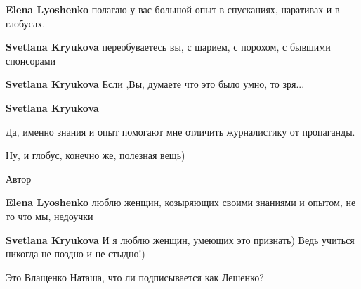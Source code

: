 \begin{itemize}
\begin{itemize}
\textbf{Elena Lyoshenko} полагаю у вас большой опыт в спусканиях, наративах и в глобусах.

 
\textbf{Svetlana Kryukova} переобуваетесь вы, с шарием, с порохом, с бывшими спонсорами

 
\textbf{Svetlana Kryukova} Если ,Вы, думаете что это было умно, то зря...

 
\textbf{Svetlana Kryukova}

Да, именно знания и опыт помогают мне отличить журналистику от пропаганды.

Ну, и глобус, конечно же, полезная вещь)


Автор
 
\textbf{Elena Lyoshenko} люблю женщин, козыряющих своими знаниями и опытом, не то что мы, недоучки

 
\textbf{Svetlana Kryukova}
И я люблю женщин, умеющих это признать) Ведь учиться никогда не поздно и не стыдно!)

 
Это Влащенко Наташа, что ли подписывается как Лешенко?


\end{itemize}
\end{itemize}
